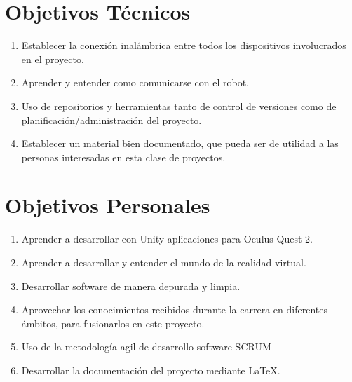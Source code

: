 \section{Objetivos Técnicos}
\begin{enumerate}
    \item Establecer la conexión inalámbrica entre todos los dispositivos involucrados en el proyecto.
    \item Aprender y entender como comunicarse con el robot.
    \item Uso de repositorios y herramientas tanto de control de versiones como de planificación/administración del proyecto.
    \item Establecer un material bien documentado, que pueda ser de utilidad a las personas interesadas en esta clase de proyectos.
\end{enumerate}

\newpage

\section{Objetivos Personales}
\begin{enumerate}
    \item Aprender a desarrollar con Unity\cite{Unity} aplicaciones para Oculus Quest 2.
    \item Aprender a desarrollar y entender el mundo de la realidad virtual\cite{VR}.
    \item Desarrollar software de manera depurada y limpia.
    \item Aprovechar los conocimientos recibidos durante la carrera en diferentes ámbitos, para fusionarlos en este proyecto.
    \item Uso de la metodología agil de desarrollo software SCRUM\cite{SCRUM}
    \item Desarrollar la documentación del proyecto mediante \LaTeX.
\end{enumerate}